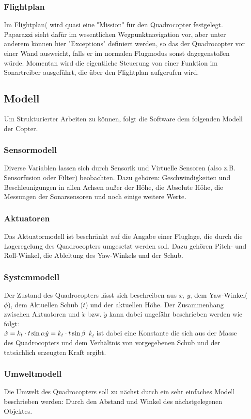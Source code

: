 \subsubsection*{Flightplan}
Im Flightplan( wird quasi eine "Mission" für den Quadrocopter festgelegt.
Paparazzi sieht dafür im wesentlichen Wegpunktnavigation vor, aber unter anderem können hier "Exceptions" definiert werden, so das der Quadrocopter vor einer Wand ausweicht, falls er im normalen Flugmodus sonst dagegenstoßen würde.
Momentan wird die eigentliche Steuerung von einer Funktion im Sonartreiber ausgeführt, die über den Flightplan aufgerufen wird.

\subsection{Modell}

Um Strukturierter Arbeiten zu können, folgt die Software dem folgenden Modell der Copter.

\subsubsection{Sensormodell}
Diverse Variablen lassen sich durch Sensorik und Virtuelle Sensoren (also z.B. Sensorfusion oder Filter) beobachten.
Dazu gehören: Geschwindigkeiten und Beschleunigungen in allen Achsen außer der Höhe, die Absolute Höhe, die Messungen der Sonarsensoren und noch einige weitere Werte.

\subsubsection{Aktuatoren}
Das Aktuatormodell ist beschränkt auf die Angabe einer Fluglage, die durch die Lageregelung des Quadrocopters umgesetzt werden soll. Dazu gehören Pitch- und Roll-Winkel, die Ableitung des Yaw-Winkels und der Schub.

\subsubsection{Systemmodell}
Der Zustand des Quadrocopters lässt sich beschreiben aus $\dot x$, $\dot y$, dem Yaw-Winkel($\phi$), dem Aktuellen Schub ($t$) und der aktuellen Höhe.
Der Zusammenhang zwischen Aktuatoren und $\dot x$ bzw. $\dot y$ kann dabei ungefähr beschrieben werden wie folgt: \\
\begin{math}
	\dot x = k_t \cdot t \sin \alpha \\ 
	\dot y = k_t \cdot t \sin \beta \\
\end{math}
$k_t$ ist dabei eine Konstante die sich aus der Masse des Quadrocopters und dem Verhältnis von vorgegebenen Schub und der tatsächlich erzeugten Kraft ergibt.

\subsubsection{Umweltmodell}
Die Umwelt des Quadrocopters soll zu nächst durch ein sehr einfaches Modell beschrieben werden: Durch den Abstand und Winkel des nächstgelegenen Objektes.
